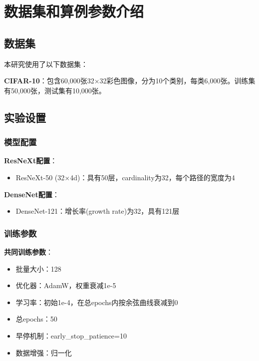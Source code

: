 \documentclass[a4paper,10pt,twocolumn]{article}
\begin{document}
\section{数据集和算例参数介绍}

\subsection{数据集}
本研究使用了以下数据集：

\textbf{CIFAR-10}：包含60,000张32×32彩色图像，分为10个类别，每类6,000张。训练集有50,000张，测试集有10,000张。

\subsection{实验设置}
\subsubsection{模型配置}


\textbf{ResNeXt配置}：
\begin{itemize}
    \item ResNeXt-50 (32×4d)：具有50层，cardinality为32，每个路径的宽度为4
\end{itemize}

\textbf{DenseNet配置}：
\begin{itemize}
    \item DenseNet-121：增长率(growth rate)为32，具有121层
\end{itemize}

\subsubsection{训练参数}

\textbf{共同训练参数}：
\begin{itemize}
    \item 批量大小：128
    \item 优化器：AdamW，权重衰减1e-5
    \item 学习率：初始1e-4，在总epochs内按余弦曲线衰减到0
    \item 总epochs：50
    \item 早停机制：early\_stop\_patience=10
    \item 数据增强：归一化
\end{itemize}
\end{document}
